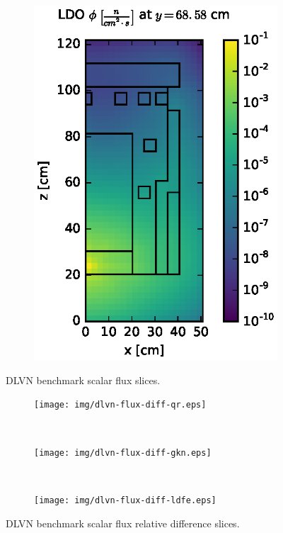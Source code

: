 \documentclass{article} %
\begin{document}
\begin{figure}[!htb]
\begin{subfigure}{0.4\textwidth}
\includegraphics[max height=0.445\textheight]
{img/dlvn-fwd-flux-ldo11.eps}
\end{subfigure}
\caption{DLVN benchmark scalar flux slices.}
\label{dlvn-fwd-slices}
\end{figure}

\begin{figure}[!hbt]
\centering
\begin{subfigure}{0.4\textwidth}
\texttt{[image: img/dlvn-flux-diff-qr.eps]}
\end{subfigure} ~
\begin{subfigure}{0.4\textwidth}
\texttt{[image: img/dlvn-flux-diff-gkn.eps]}
\label{dlvn-fwd-diff-gkn}
\end{subfigure}
\\
\begin{subfigure}{0.4\textwidth}
\texttt{[image: img/dlvn-flux-diff-ldfe.eps]}
\end{subfigure}
\caption{DLVN benchmark scalar flux relative difference slices.}
\label{dlvn-fwd-diff-rel}
\end{figure}
\end{document}
